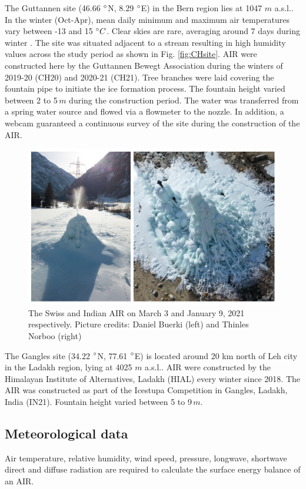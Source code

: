 \documentclass[utf8]{frontiersSCNS} %
\begin{document}
The Guttannen site (46.66 $\degree$N, 8.29 $\degree$E) in the Bern region lies at 1047 $m$ a.s.l.. In the winter
(Oct-Apr), mean daily minimum and maximum air temperatures vary between -13 and 15 $\degree C$. Clear skies are rare,
averaging around 7 days during winter \citep{eispalast}. The site was situated adjacent to a stream resulting in high
humidity values across the study period as shown in Fig. \ref{fig:CHsite}. AIR were constructed here by the Guttannen
Bewegt Association during the winters of 2019-20 (CH20) and 2020-21 (CH21). Tree branches were laid covering the
fountain pipe to initiate the ice formation process. The fountain height varied between 2 to 5\,$m$ during the
construction period. The water was transferred from a spring water source and flowed via a flowmeter to the nozzle. In
addition, a webcam guaranteed a continuous survey of the site during the construction of the AIR.

\begin{figure}
	\begin{center}
		\includegraphics[width=12 cm]{Figures/2AIR.jpg}
	\end{center}
	\caption{The Swiss and Indian AIR on March 3 and January 9, 2021 respectively. Picture credits: Daniel Buerki (left)
		and Thinles Norboo (right)}
	\label{fig:2AIR}
\end{figure}

The Gangles site (34.22 $\degree$N, 77.61 $\degree$E) is located around 20 km north of Leh city in the Ladakh region,
lying at 4025 $m$ a.s.l.. AIR were constructed by the Himalayan Institute of Alternatives, Ladakh (HIAL) every winter
since 2018. The AIR was constructed as part of the Icestupa Competition in Gangles, Ladakh, India (IN21). Fountain
height varied between 5 to 9\,$m$.

\subsection{Meteorological data}
Air temperature, relative humidity, wind speed, pressure, longwave, shortwave direct and diffuse radiation are required
to calculate the surface energy balance of an AIR.
\end{document}

